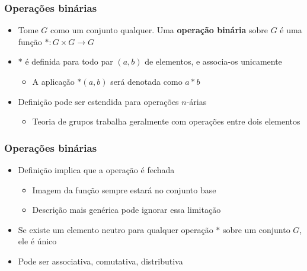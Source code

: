\documentclass[12pt]{beamer}
\begin{document}
\begin{frame}
  \frametitle{Operações binárias}
  \begin{itemize}
    \item<1-> Tome $G$ como um conjunto qualquer. Uma \textbf{operação binária}
        sobre $G$ é uma função $* : G \times G \rightarrow G$
    \item<2-> $*$ é definida para todo par $(a, b)$ de elementos, e associa-os
        unicamente
    \begin{itemize}[itemsep=0pt]
      \item A aplicação $*(a, b)$ será denotada como $a * b$
    \end{itemize}
    \item<3-> Definição pode ser estendida para operações $n$-árias
    \begin{itemize}
      \item Teoria de grupos trabalha geralmente com operações entre dois
          elementos
    \end{itemize}
  \end{itemize}
\end{frame}

\begin{frame}
  \frametitle{Operações binárias}
  \begin{itemize}
   \item<1-> Definição implica que a operação é fechada
    \begin{itemize}[itemsep=0pt]
      \item Imagem da função sempre estará no conjunto base
      \item Descrição mais genérica pode ignorar essa limitação
    \end{itemize}
   \item<2-> Se existe um elemento neutro para qualquer operação $*$ sobre um
       conjunto $G$, ele é único
   \item<3-> Pode ser associativa, comutativa, distributiva
  \end{itemize}
\end{frame}
\end{document}
